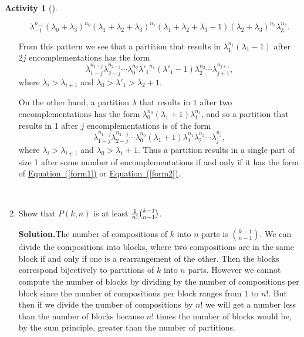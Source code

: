 \documentclass[10pt,]{book}
\theoremstyle{plain}
\theoremstyle{definition}
\newtheorem{activity}[project]{Activity}
\numberwithin{equation}{chapter}
\begin{document}
\begin{activity}[]
\begin{enumerate}[label=(\alph*)]
\begin{equation*}
\lambda_{-1}^{n_{-1}}(\lambda_0+\lambda_{3})^{n_0}(\lambda_1+
\lambda_2 +
\lambda_{3})^{n_1}(\lambda_1+\lambda_2 +\lambda_3-1)(\lambda_2+
\lambda_{3})^{n_3}
\lambda_3^{n_3}.
\end{equation*}
%
\par
From this pattern we see that a partition that results in \(\lambda_1^{n_1}(\lambda_1-1)\) after \(2j\) encomplementations has the form%
\begin{equation}
\lambda_{1-j}^{n_{1-j}}\lambda_{2-j}^{n_{2-j}}\cdots
\lambda_0^{n_0}
{\lambda'_1}^{n_1}
(\lambda'_1-1)\lambda_2^{n_2}\cdots
\lambda_{j+1}^{n_{j+1}},\label{form1}
\end{equation}
where \(\lambda_i>\lambda_{i+1}\) and \(\lambda_0>\lambda'_1>\lambda_2+1\).%
\par
On the other hand, a partition \(\lambda\) that results in \(1\) after two encomplementations has the form \(\lambda_0^{n_0}(\lambda_1+1)\lambda_1^{n_1}\), and so a partition that results in 1 after \(j\) encomplementations is of the form%
\begin{equation}
\lambda_{1-j}^{n_{1-j}}\lambda_{2-j}^{n_{2-j}}\cdots
\lambda_0^{n_0}(\lambda_1+1)\lambda_1^{n_1}\lambda_2^{n_2}\cdots
\lambda_j^{n_j},\label{form2}
\end{equation}
where \(\lambda_i>\lambda_{i+1}\) and \(\lambda_0>\lambda_1+1\). Thus a partition results in a single part of size 1 after some number of encomplementations if and only if it has the form of \hyperref[form1]{Equation~(\ref{form1})} or \hyperref[form2]{Equation~(\ref{form2})}.%

~\par
\item Show that \(P(k,n)\) is at least \({1\over n!}{k-1\choose n-1}\).%
\par\medskip\noindent%
\textbf{Solution.}\quad The number of compositions of \(k\) into \(n\) parts is \(k-1\choose n-1\). We can divide the compositions into blocks, where two compositions are in the same block if and only if one is a rearrangement of the other. Then the blocks correspond bijectively to partitions of \(k\) into \(n\) parts. However we cannot compute the number of blocks by dividing by the number of compositions per block since the number of compositions per block ranges from \(1\) to \(n!\).  But then if we divide the number of compositions by \(n!\) we will get a number less than the number of blocks because \(n!\) times the number of blocks would be, by the sum principle, greater than the number of partitions.%

\end{enumerate}
\end{activity}
\end{document}
